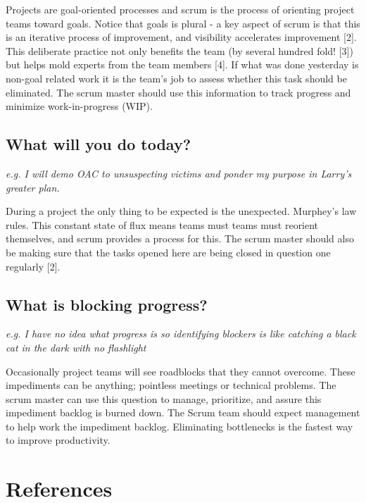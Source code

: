 \documentclass[12pt]{article}%
\begin{document}
Projects are goal-oriented processes and scrum is the process of orienting project teams toward goals. Notice that goals is plural -
a key aspect of scrum is that this is an iterative process of improvement, and visibility accelerates improvement [2]. This deliberate practice not only benefits the team (by several hundred fold! [3]) but helps mold experts from the team members [4]. If what was done yesterday is non-goal related work it is the team's job to assess whether this task should be eliminated. The scrum master should use this information to track progress and minimize work-in-progress (WIP). 

\vspace{5cm}


\subsection{What will you do today?}
\textit{e.g. I will demo OAC to unsuspecting victims and ponder my purpose in Larry's greater plan.}
\newline 

During a project the only thing to be expected is the unexpected. Murphey's law rules. 
This constant state of flux means teams must teams must reorient themselves, and scrum provides a process for this. 
The scrum master should also be making sure that the tasks opened here are being closed in question one regularly [2].

\vspace{6.5cm}

\subsection{What is blocking progress?}
\textit{e.g. I have no idea what progress is so identifying blockers is like catching a black cat in the dark with no flashlight}
\newline

Occasionally project teams will see roadblocks that they cannot overcome. These impediments can be anything; pointless meetings or technical problems. 
The scrum master can use this question to manage, prioritize, and assure this impediment backlog is burned down. 
The Scrum team should expect management to help work the impediment backlog. Eliminating bottlenecks is the fastest way to improve productivity.

\vspace{6.5cm}

\section{References}
\end{document}
